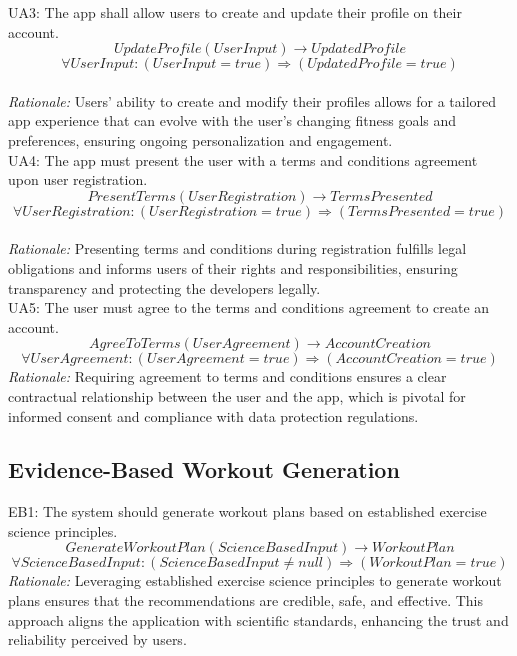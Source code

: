 \documentclass[12pt]{article}
\begin{document}
UA3: The app shall allow users to create and update their profile on their account.
\[UpdateProfile(UserInput) \rightarrow UpdatedProfile \]
\[ \forall UserInput: (UserInput = true) \Rightarrow (UpdatedProfile = true) \]\\
\textit{Rationale:} Users' ability to create and modify their profiles allows for a tailored app experience that can evolve with the user’s changing fitness goals and preferences, ensuring ongoing personalization and engagement.
\\

UA4: The app must present the user with a terms and conditions agreement upon user registration.
\[PresentTerms(UserRegistration) \rightarrow TermsPresented \]
\[ \forall UserRegistration: (UserRegistration = true) \Rightarrow (TermsPresented = true) \]\\
\textit{Rationale:} Presenting terms and conditions during registration fulfills legal obligations and informs users of their rights and responsibilities, ensuring transparency and protecting the developers legally.
\\

UA5: The user must agree to the terms and conditions agreement to create an account.
\[AgreeToTerms(UserAgreement) \rightarrow AccountCreation \]
\[ \forall UserAgreement: (UserAgreement = true) \Rightarrow (AccountCreation = true) \]
\textit{Rationale:} Requiring agreement to terms and conditions ensures a clear contractual relationship between the user and the app, which is pivotal for informed consent and compliance with data protection regulations.
\\

\subsection{Evidence-Based Workout Generation}

\parindent EB1: The system should generate workout plans based on established exercise science principles.
\[GenerateWorkoutPlan(ScienceBasedInput) \rightarrow WorkoutPlan \]
\[ \forall ScienceBasedInput: (ScienceBasedInput \neq null) \Rightarrow (WorkoutPlan = true) \]
\textit{Rationale:} Leveraging established exercise science principles to generate workout plans ensures that the recommendations are credible, safe, and effective. This approach aligns the application with scientific standards, enhancing the trust and reliability perceived by users.
\\
\end{document}
